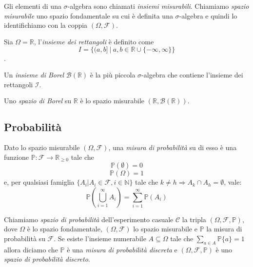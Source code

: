 Gli elementi di una $\sigma$-algebra sono chiamati \emph{insiemi misurabili}. Chiamiamo \emph{spazio misurabile} uno spazio fondamentale su cui è definita una $\sigma$-algebra e quindi lo identifichiamo con la coppia $(\Omega, \mathcal{F})$.

\begin{mtdef}
	Sia $\Omega=\mathbb{R}$, l'\emph{insieme dei rettangoli} è definito come $$ I = \{(a,b] \ | \ a,b\in \mathbb{R} \cup \{-\infty,\infty\}\} $$.
\end{mtdef}

\begin{mtdef}
	Un \emph{insieme di Borel} $\mathcal{B}(\mathbb{R})$ è la più piccola $\sigma$-algebra che contiene l'insieme dei rettangoli $\mathcal{I}$.
\end{mtdef}

\begin{mtdef}
	Uno \emph{spazio di Borel} su $\mathbb{R}$ è lo spazio misurabile $(\mathbb{R},\mathcal{B}(\mathbb{R}))$.
\end{mtdef}

\subsection{Probabilità}

\begin{mtdef}
	Dato lo spazio misurabile $(\Omega,\mathcal{F})$, una \emph{misura di probabilità} su di esso è una funzione $\mathbb{P} : \mathcal{F} \rightarrow \mathbb{R}_{\geq 0}$ tale che
	\begin{equation}
		\mathbb{P}(\emptyset) = 0
	\end{equation}
	\begin{equation}
		\mathbb{P}(\Omega) = 1
	\end{equation}
	e, per qualsiasi famiglia $\{A_i | A_i \in \mathcal{F}, i \in \mathbb{N}\}$ tale che $k \neq h \Rightarrow A_k \cap A_h = \emptyset$, vale:
	\begin{equation}
		 \mathbb{P}\left(\bigcup_{i=1}^\infty A_i\right) = \sum_{i=1}^\infty \mathbb{P}\left(A_i\right)
	\end{equation}
\end{mtdef}

Chiamiamo \emph{spazio di probabilità} dell'esperimento casuale $\mathcal{C}$ la tripla $(\Omega, \mathcal{F}, \mathbb{P})$, dove $\Omega$ è lo spazio fondamentale, $(\Omega, \mathcal{F})$ lo spazio misurabile e $\mathbb{P}$ la misura di probabilità su $\mathcal{F}$.
Se esiste l'insieme numerabile $A \subseteq \Omega$ tale che $\sum_{a \in A} \mathbb{P}\{a\} = 1$ allora diciamo che $\mathbb{P}$ è una \emph{misura di probabilità discreta} e $(\Omega, \mathcal{F}, \mathbb{P})$ è uno \emph{spazio di probabilità discreto}.

